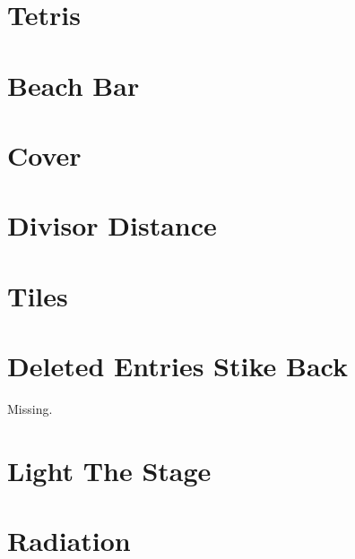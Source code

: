 \documentclass[a4paper, 10pt]{article}
\let\stdsection\section
\renewcommand\section{\newpage\stdsection}
\newcommand{\includecode}[1]{
    }
\newcommand{\algoAuthor}{2} %
\begin{document}
    \section{Tetris}
        \label{sec:tetris}
        \includecode{../problems/w10/Tetris/Tetris\algoAuthor.cpp}
 
    
    \section{Beach Bar}
        \label{sec:beach_bar}
        \includecode{../problems/w11/Beach_Bar/BeachBar\algoAuthor.cpp}
        
    \section{Cover}
        \label{sec:cover}
        \includecode{../problems/w11/Cover/Cover\algoAuthor.cpp}
        
    \section{Divisor Distance}
        \label{sec:divisor_distance}
        \includecode{../problems/w11/Divisor_Distance/DivisorDistance\algoAuthor.cpp}
        
    \section{Tiles}
        \label{sec:tiles}
        \includecode{../problems/w11/Tiles/Tiles\algoAuthor.cpp}
        
    
    \section{Deleted Entries Stike Back}
        \label{sec:deleted_entries_strike_back}
        Missing.
        
    \section{Light The Stage}
        \label{sec:light_the_stage}
        \includecode{../problems/w12/Light_The_Stage/LightTheStage\algoAuthor.cpp}
        
    \section{Radiation}
        \label{sec:radiation}
        \includecode{../problems/w12/Radiation/Radiation\algoAuthor.cpp}
        
\end{document}

